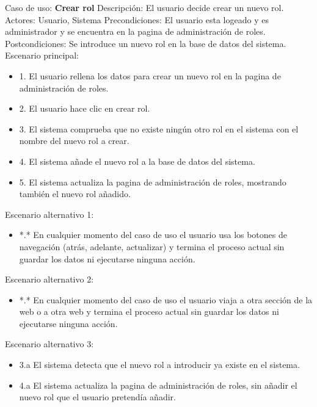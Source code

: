 Caso de uso: \textbf{Crear rol}
\newline
Descripción: El usuario decide crear un nuevo rol.
\newline
Actores: Usuario, Sistema
\newline
Precondiciones: El usuario esta logeado y es administrador y se encuentra en la pagina de administración de roles.
\newline
Postcondiciones: Se introduce un nuevo rol en la base de datos del sistema.
\newline
Escenario principal:
\begin{itemize}
	\item 1. El usuario rellena los datos para crear un nuevo rol en la pagina de administración de roles.
	\item 2. El usuario hace clic en crear rol.
	\item 3. El sistema comprueba que no existe ningún otro rol en el sistema con el nombre del nuevo rol a crear.
	\item 4. El sistema añade el nuevo rol a la base de datos del sistema.
 \item 5. El sistema actualiza la pagina de administración de roles, mostrando también el nuevo rol añadido.
\end{itemize}
Escenario alternativo 1: 
\begin{itemize}
	\item *.* En cualquier momento del caso de uso el usuario usa los botones de navegación (atrás, adelante, actualizar) y termina el proceso actual sin guardar los datos ni ejecutarse ninguna acción.
\end{itemize}
Escenario alternativo 2:
\begin{itemize}
	\item *.* En cualquier momento del caso de uso el usuario viaja a otra sección de la web o a otra web y termina el proceso actual sin guardar los datos ni ejecutarse ninguna acción.
\end{itemize}
Escenario alternativo 3:
\begin{itemize}
	\item 3.a El sistema detecta que el nuevo rol a introducir ya existe en el sistema.
	\item 4.a El sistema actualiza la pagina de administración de roles, sin añadir el nuevo rol que el usuario pretendía añadir.
\end{itemize}

